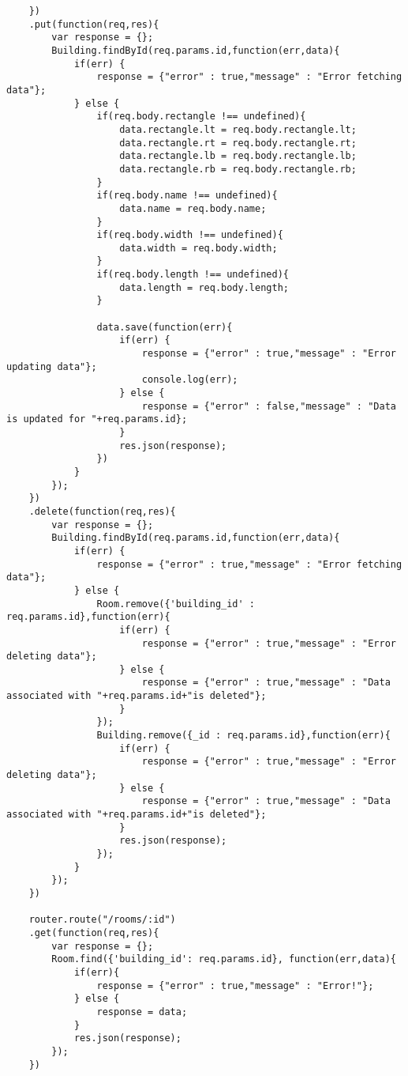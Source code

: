 \begin{lstlisting}
    })
    .put(function(req,res){
        var response = {};
        Building.findById(req.params.id,function(err,data){
            if(err) {
                response = {"error" : true,"message" : "Error fetching data"};
            } else {
                if(req.body.rectangle !== undefined){
                    data.rectangle.lt = req.body.rectangle.lt;
                    data.rectangle.rt = req.body.rectangle.rt;
                    data.rectangle.lb = req.body.rectangle.lb;
                    data.rectangle.rb = req.body.rectangle.rb;
                }
                if(req.body.name !== undefined){
                    data.name = req.body.name;
                }
                if(req.body.width !== undefined){
                    data.width = req.body.width;
                }
                if(req.body.length !== undefined){
                    data.length = req.body.length;
                }
                
                data.save(function(err){
                    if(err) {
                        response = {"error" : true,"message" : "Error updating data"};
                        console.log(err);
                    } else {
                        response = {"error" : false,"message" : "Data is updated for "+req.params.id};
                    }
                    res.json(response);
                })
            }
        });
    })
    .delete(function(req,res){
        var response = {};
        Building.findById(req.params.id,function(err,data){
            if(err) {
                response = {"error" : true,"message" : "Error fetching data"};
            } else {
                Room.remove({'building_id' : req.params.id},function(err){
                    if(err) {
                        response = {"error" : true,"message" : "Error deleting data"};
                    } else {
                        response = {"error" : true,"message" : "Data associated with "+req.params.id+"is deleted"};
                    }
                });
                Building.remove({_id : req.params.id},function(err){
                    if(err) {
                        response = {"error" : true,"message" : "Error deleting data"};
                    } else {
                        response = {"error" : true,"message" : "Data associated with "+req.params.id+"is deleted"};
                    }
                    res.json(response);
                });
            }
        });
    })

    router.route("/rooms/:id")
    .get(function(req,res){
        var response = {};
        Room.find({'building_id': req.params.id}, function(err,data){
            if(err){
                response = {"error" : true,"message" : "Error!"};
            } else {
                response = data;
            }
            res.json(response);
        });
    })


\end{lstlisting}
